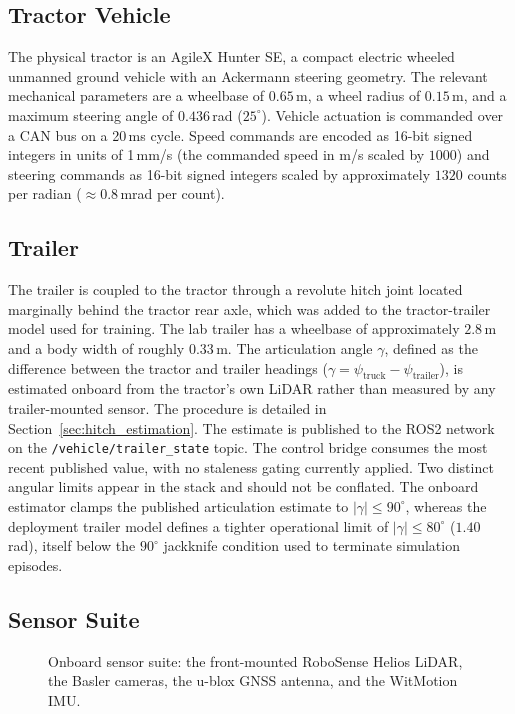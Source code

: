 \subsection{Tractor Vehicle}

The physical tractor is an AgileX Hunter SE, a compact electric wheeled unmanned ground vehicle with an Ackermann steering geometry. The relevant mechanical parameters are a wheelbase of $0.65$\,m, a wheel radius of $0.15$\,m, and a maximum steering angle of $0.436$\,rad ($25^\circ$). Vehicle actuation is commanded over a CAN bus on a 20\,ms cycle. Speed commands are encoded as 16-bit signed integers in units of 1\,mm/s (the commanded speed in m/s scaled by $1000$) and steering commands as 16-bit signed integers scaled by approximately $1320$ counts per radian ($\approx 0.8$\,mrad per count).

\subsection{Trailer}

The trailer is coupled to the tractor through a revolute hitch joint located marginally behind the tractor rear axle, which was added to the tractor-trailer model used for training. The lab trailer has a wheelbase of approximately $2.8$\,m and a body width of roughly $0.33$\,m. The articulation angle $\gamma$, defined as the difference between the tractor and trailer headings ($\gamma = \psi_\text{truck} - \psi_\text{trailer}$), is estimated onboard from the tractor's own LiDAR rather than measured by any trailer-mounted sensor. The procedure is detailed in Section~\ref{sec:hitch_estimation}. The estimate is published to the ROS2 network on the \texttt{/vehicle/trailer\_state} topic. The control bridge consumes the most recent published value, with no staleness gating currently applied. Two distinct angular limits appear in the stack and should not be conflated. The onboard estimator clamps the published articulation estimate to $|\gamma| \le 90^\circ$, whereas the deployment trailer model defines a tighter operational limit of $|\gamma| \le 80^\circ$ ($1.40$\,rad), itself below the $90^\circ$ jackknife condition used to terminate simulation episodes.

\subsection{Sensor Suite}

\begin{figure}[t]
  \centering
  \caption{Onboard sensor suite: the front-mounted RoboSense Helios LiDAR, the Basler cameras, the u-blox GNSS antenna, and the WitMotion IMU.}
  \label{fig:hw_sensors}
\end{figure}


